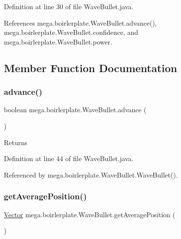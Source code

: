 Definition at line 30 of file Wave\+Bullet.\+java.



References mega.\+boirlerplate.\+Wave\+Bullet.\+advance(), mega.\+boirlerplate.\+Wave\+Bullet.\+confidence, and mega.\+boirlerplate.\+Wave\+Bullet.\+power.



\subsection{Member Function Documentation}
\mbox{\label{classmega_1_1boirlerplate_1_1_wave_bullet_a5014821e51596d5de8fba56c9018151a}} 
\subsubsection{\texorpdfstring{advance()}{advance()}}
{\footnotesize\ttfamily boolean mega.\+boirlerplate.\+Wave\+Bullet.\+advance (\begin{DoxyParamCaption}{ }\end{DoxyParamCaption})}

\begin{DoxyReturn}{Returns}

\end{DoxyReturn}


Definition at line 44 of file Wave\+Bullet.\+java.



Referenced by mega.\+boirlerplate.\+Wave\+Bullet.\+Wave\+Bullet().

\mbox{\label{classmega_1_1boirlerplate_1_1_wave_bullet_a86a07c0211d4f3c181f16490f878154c}} 
\subsubsection{\texorpdfstring{get\+Average\+Position()}{getAveragePosition()}}
{\footnotesize\ttfamily \hyperlink{classmega_1_1boirlerplate_1_1_vector}{Vector} mega.\+boirlerplate.\+Wave\+Bullet.\+get\+Average\+Position (\begin{DoxyParamCaption}{ }\end{DoxyParamCaption})}

